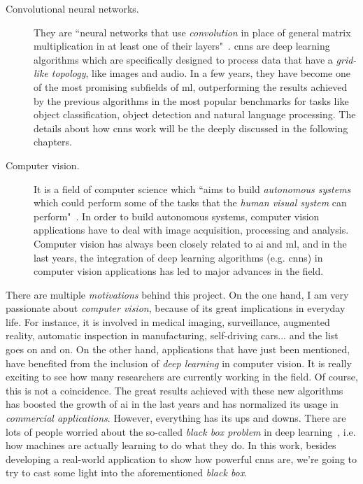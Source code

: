 \begin{description}
	\item[Convolutional neural networks.] They are ``neural networks that use \emph{convolution} in place of general matrix multiplication in at least one of their layers"~\cite{Goodfellow-et-al-2016}. \glspl{cnn} are deep learning algorithms which are specifically designed to process data that have a \emph{grid-like topology}, like images and audio. In a few years, they have become one of the most promising subfields of \gls{ml}, outperforming the results achieved by the previous algorithms in the most popular benchmarks for tasks like object classification, object detection and natural language processing. The details about how \glspl{cnn} work will be the deeply discussed in the following chapters.
\end{description}

\begin{description}
	\item[Computer vision.] It is a field of computer science which ``aims to build \emph{autonomous systems} which could perform some of the tasks that the \emph{human visual system} can perform"~\cite{huang1996computer}. In order to build autonomous systems, computer vision applications have to deal with image acquisition, processing and analysis. Computer vision has always been closely related to \gls{ai} and \gls{ml}, and in the last years, the integration of deep learning algorithms (e.g. \glspl{cnn}) in computer vision applications has led to major advances in the field.
\end{description}

There are multiple \emph{motivations} behind this project. On the one hand, I am very passionate about \emph{computer vision}, because of its great implications in everyday life. For instance, it is involved in medical imaging, surveillance, augmented reality, automatic inspection in manufacturing, self-driving cars... and the list goes on and on. On the other hand, applications that have just been mentioned, have benefited from the inclusion of \emph{deep learning} in computer vision. It is really exciting to see how many researchers are currently working in the field. Of course, this is not a coincidence. The great results achieved with these new algorithms has boosted the growth of \gls{ai} in the last years and has normalized its usage in \emph{commercial applications}. However, everything has its ups and downs. There are lots of people worried about the so-called \emph{\textit{black box} problem} in deep learning~\cite{black-box}, i.e. how machines are actually learning to do what they do. In this work, besides developing a real-world application to show how powerful \glspl{cnn} are, we're going to try to cast some light into the aforementioned \textit{black box}. 

